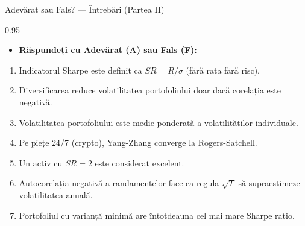 \documentclass[9pt, aspectratio=169, t]{beamer}
\begin{document}
\begin{frame}[shrink=10]{Adevărat sau Fals? --- Întrebări (Partea II)}
\begin{cminipage}{0.95\textwidth}
    \begin{itemize}\setlength{\itemsep}{0pt}
        \item \textbf{Răspundeți cu Adevărat (A) sau Fals (F):}
    \end{itemize}
    \vspace{0.3cm}
    \begin{enumerate}\setlength{\itemsep}{0pt}
        \setcounter{enumi}{7}
        \item Indicatorul Sharpe este definit ca $SR = \bar{R} / \sigma$ (fără rata fără risc).
        \item Diversificarea reduce volatilitatea portofoliului doar dacă corelația este negativă.
        \item Volatilitatea portofoliului este medie ponderată a volatilităților individuale.
        \item Pe piețe 24/7 (crypto), Yang-Zhang converge la Rogers-Satchell.
        \item Un activ cu $SR = 2$ este considerat excelent.
        \item Autocorelația negativă a randamentelor face ca regula $\sqrt{T}$ să supraestimeze volatilitatea anuală.
        \item Portofoliul cu varianță minimă are întotdeauna cel mai mare Sharpe ratio.
    \end{enumerate}
\end{cminipage}
\end{frame}
\end{document}
